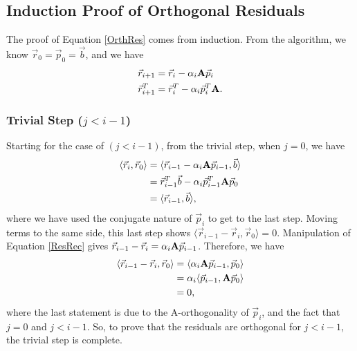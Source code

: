 \documentclass[11pt,letterpaper,oneside,notitlepage]{article}	%
\newcommand{\bfa}{{\bf A}}						%
\newcommand{\ip}[2]{\langle \vec #1,\vec #2 \rangle}	%
\newcommand{\eq}[1]{Equation \eqref{#1}}		%
\newcommand{\pindent}[1]{\hspace{6mm}}  		%
\numberwithin{equation}{section}				%
\begin{document}
\subsection{Induction Proof of Orthogonal Residuals}%
\pindent{}The proof of \eq{OrthRes} comes from induction. From the algorithm, we know $\vec r_0 = \vec p_0 = \vec b$, and we have 
\begin{align}
\vec r_{i+1} &= \vec r_i - \alpha_i\bfa\vec p_i \label{ResRec} \\  \notag %
\vec r_{i+1}^T &= \vec r_i^T - \alpha_i\vec p_i^T\bfa.
\end{align}

\subsubsection{Trivial Step ($j<i-1$)}%
\pindent{}Starting for the case of $(j<i-1)$, from the trivial step, when $j=0$, we have
\begin{align*}
\ip{r_i}{r_0} &= \langle \vec r_{i-1} - \alpha_i\bfa\vec p_{i-1} ,\vec b\rangle \\
&=  \vec r_{i-1}^T\vec b - \alpha_i\vec p_{i-1}^T\bfa\vec p_0 \\ 
&=  \ip{r_{i-1}}{b}
,\end{align*}
where we have used the conjugate nature of $\vec p_i$ to get to the last step. Moving terms to the same side, this last step shows $\ip{r_{i-1}- \vec r_i}{r_0} = 0$. Manipulation of \eq{ResRec} gives $\vec r_{i-1}-\vec r_i = \alpha_i \bfa\vec p_{i-1}$. Therefore, we have
\begin{align*}
\langle \vec r_{i-1}-\vec r_i,\vec r_0 \rangle &= \langle \alpha_i \bfa\vec p_{i-1} , \vec p_0 \rangle \\
&= \alpha_i \langle \vec p_{i-1} , \bfa\vec p_0 \rangle \\
&= 0,
\end{align*}
where the last statement is due to the A-orthogonality of $\vec p_i$, and the fact that  $j=0$ and $j<i-1$. So, to prove that the residuals are orthogonal for $j<i-1$, the trivial step is complete. 
\end{document}
